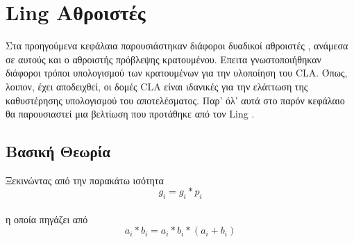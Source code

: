 \section{Ling Αθροιστές}
Στα προηγούμενα κεφάλαια παρουσιάστηκαν διάφοροι δυαδικοί αθροιστές , 
ανάμεσα σε αυτούς και ο αθροιστής πρόβλεψης κρατουμένου. Επειτα γνωστοποιήθηκαν 
διάφοροι τρόποι υπολογισμού των κρατουμένων για την υλοποίηση του CLA. Όπως, λοιπον,
έχει αποδειχθεί, οι δομές CLA είναι ιδανικές για την ελάττωση της καθυστέρησης υπολογισμού
του αποτελέσματος. Παρ' όλ' αυτά στο παρόν κεφάλαιο θα παρουσιαστεί μια βελτίωση που προτάθηκε 
από τον Ling \cite{5390638} .



\subsection{Βασική Θεωρία}

Ξεκινώντας από την παρακάτω ισότητα 
\begin{equation}
    g_i = g_i*p_i
\end{equation}
\\
η οποία πηγάζει από 
\begin{equation*}
    a_i * b_i = a_i * b_i * (a_i + b_i)
\end{equation*}

